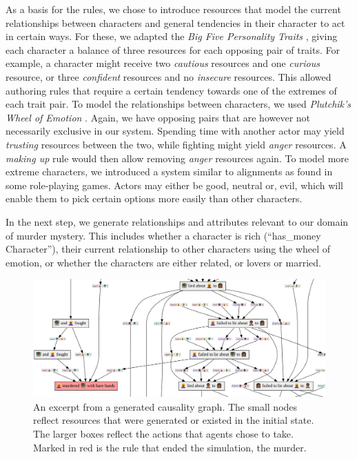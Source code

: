 As a basis for the rules, we chose to introduce resources that model the current relationships between characters and general tendencies in their character to act in certain ways. For these, we adapted the \emph{Big Five Personality Traits} \cite{rothmann_coetzer_2003}, giving each character a balance of three resources for each opposing pair of traits. For example, a character might receive two \emph{cautious} resources and one \emph{curious} resource, or three \emph{confident} resources and no \emph{insecure} resources. This allowed authoring rules that require a certain tendency towards one of the extremes of each trait pair. To model the relationships between characters, we used \emph{Plutchik's Wheel of Emotion} \cite{plutchik_2001}. Again, we have opposing pairs that are however not necessarily exclusive in our system. Spending time with another actor may yield \emph{trusting} resources between the two, while fighting might yield \emph{anger} resources. A \emph{making up} rule would then allow removing \emph{anger} resources again. To model more extreme characters, we introduced a system similar to alignments as found in some role-playing games. Actors may either be good, neutral or, evil, which will enable them to pick certain options more easily than other characters.

In the next step, we generate relationships and attributes relevant to our domain of murder mystery. This includes whether a character is rich (\enquote{has\_money Character}), their current relationship to other characters using the wheel of emotion, or whether the characters are either related, or lovers or married.

\begin{figure}
  \includegraphics[width=\textwidth]{graph.png}
  \caption{An excerpt from a generated causality graph. The small nodes reflect resources that were generated or existed in the initial state. The larger boxes reflect the actions that agents chose to take. Marked in red is the rule that ended the simulation, the murder.}
\end{figure}

